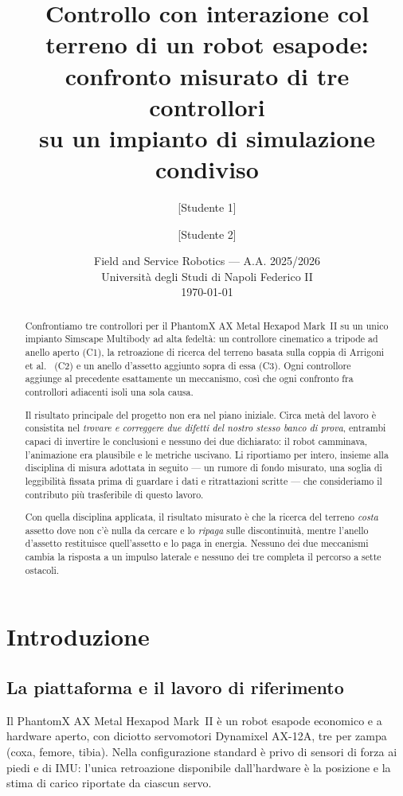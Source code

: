 \documentclass[11pt,a4paper]{article}
\title{\textbf{Controllo con interazione col terreno di un robot esapode:\\
confronto misurato di tre controllori\\ su un impianto di simulazione condiviso}}
\author{[Studente 1] \and [Studente 2]}
\date{Field and Service Robotics --- A.A. 2025/2026\\
Universit\`a degli Studi di Napoli Federico II\\[4pt]
\today}
\newcommand{\Co}{\textsf{C1}}
\newcommand{\Ct}{\textsf{C2}}
\newcommand{\Cth}{\textsf{C3}}
\begin{document}
\maketitle

\begin{abstract}
\noindent
Confrontiamo tre controllori per il PhantomX AX Metal Hexapod Mark~II su un
unico impianto Simscape Multibody ad alta fedelt\`a: un controllore cinematico
a tripode ad anello aperto (\Co), la retroazione di ricerca del terreno basata
sulla coppia di Arrigoni et al.~\cite{arrigoni2024} (\Ct) e un anello
d'assetto aggiunto sopra di essa (\Cth). Ogni controllore aggiunge al
precedente esattamente un meccanismo, cos\`i che ogni confronto fra controllori
adiacenti isoli una sola causa.

Il risultato principale del progetto non era nel piano iniziale. Circa met\`a
del lavoro \`e consistita nel \emph{trovare e correggere due difetti del nostro
stesso banco di prova}, entrambi capaci di invertire le conclusioni e nessuno
dei due dichiarato: il robot camminava, l'animazione era plausibile e le
metriche uscivano. Li riportiamo per intero, insieme alla disciplina di misura
adottata in seguito --- un rumore di fondo misurato, una soglia di leggibilit\`a
fissata prima di guardare i dati e ritrattazioni scritte --- che consideriamo il
contributo pi\`u trasferibile di questo lavoro.

Con quella disciplina applicata, il risultato misurato \`e che la ricerca del
terreno \emph{costa} assetto dove non c'\`e nulla da cercare e lo \emph{ripaga}
sulle discontinuit\`a, mentre l'anello d'assetto restituisce quell'assetto e lo
paga in energia. Nessuno dei due meccanismi cambia la risposta a un impulso
laterale e nessuno dei tre completa il percorso a sette ostacoli.
\end{abstract}

\tableofcontents
\newpage

\section{Introduzione}
\label{sec:intro}

\subsection{La piattaforma e il lavoro di riferimento}

Il PhantomX AX Metal Hexapod Mark~II \`e un robot esapode economico e a
hardware aperto, con diciotto servomotori Dynamixel AX-12A, tre per zampa
(coxa, femore, tibia). Nella configurazione standard \`e privo di sensori di
forza ai piedi e di IMU: l'unica retroazione disponibile dall'hardware \`e la
posizione e la stima di carico riportate da ciascun servo.
\end{document}
